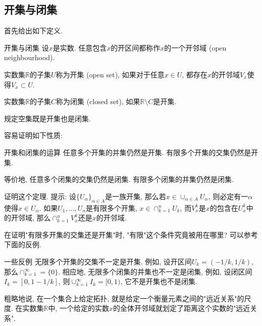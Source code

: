 

\subsection{开集与闭集}

首先给出如下定义.

\begin{definition}{开集与闭集}
设$x$是实数. 任意包含$x$的开区间都称作$x$的一个开邻域 (open neighbourhood).

实数集$\mathbb{R}$的子集$U$称为开集 (open set), 如果对于任意$x\in U$, 都存在$x$的开邻域$V_x$使得$V_x\subset U$. 

实数集$\mathbb{R}$的子集$C$称为闭集 (closed set), 如果$\mathbb{R}\setminus C$是开集.

规定空集既是开集也是闭集.
\end{definition}

容易证明如下性质:

\begin{theorem}{开集和闭集的运算}
任意多个开集的并集仍然是开集. 有限多个开集的交集仍然是开集.

等价地, 任意多个闭集的交集仍然是闭集. 有限多个闭集的并集仍然是闭集.
\end{theorem}

\begin{exercise}{}
证明这个定理. 提示: 设$\{U_\alpha\}_{\alpha\in A}$是一族开集, 那么若$x\in \cup_{\alpha\in A}U_\alpha$, 则必定有一$\alpha$使得$x\in U_\alpha$. 如果$U_1,...,U_n$是有限多个开集, $x\in\cap_{k=1}^nU_k$, 而$V_x^k$是$x$的包含在$U_x^k$中的开邻域, 那么$\cap_{k=1}^nV_x^k$还是$x$的开邻域.
\end{exercise}

\begin{exercise}{}
在证明"有限多开集的交集还是开集"时, "有限"这个条件究竟被用在哪里? 可以参考下面的反例.
\end{exercise}

\begin{example}{一些反例}
无限多个开集的交集不一定是开集. 例如, 设开区间$U_k=(-1/k,1/k)$, 那么$\cap_{k=1}^\infty=\{0\}$. 相应地, 无限多个闭集的并集也不一定是闭集, 例如, 设闭区间$I_k=[0,1-1/k]$, 则$\cup_{k=1}^\infty I_k=[0,1)$, 它不是开集也不是闭集.
\end{example}

粗略地说, 在一个集合上给定拓扑, 就是给定一个衡量元素之间的"远近关系"的尺度. 在实数集$\mathbb{R}$中, 一个给定的实数$x$的全体开邻域就划定了距离这个实数的"远近关系". 

